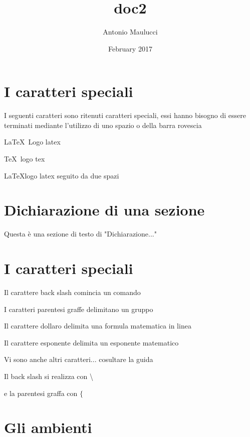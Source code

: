 \documentclass[a4]{article}
\title{doc2}
\author{Antonio Maulucci}
\date{February 2017}
\begin{document}
\maketitle

\section{I caratteri speciali}

I seguenti caratteri sono ritenuti caratteri speciali, essi hanno bisogno di essere terminati mediante l'utilizzo di uno spazio o della barra rovescia

\LaTeX\ Logo latex

\TeX\ logo tex

\LaTeX  logo latex seguito da due spazi

%
%
\section{Dichiarazione di una sezione}
Questa è una sezione di testo di "Dichiarazione..."

%
%

%
%
\section{I caratteri speciali}

Il carattere back slash comincia un comando

I caratteri parentesi graffe delimitano un gruppo

Il carattere dollaro delimita una formula matematica in linea

Il carattere esponente delimita un esponente matematico

Vi sono anche altri caratteri... cosultare la guida

Il back slash si realizza con \textbackslash

e la parentesi graffa con $\{$

\section{Gli ambienti}
\end{document}
